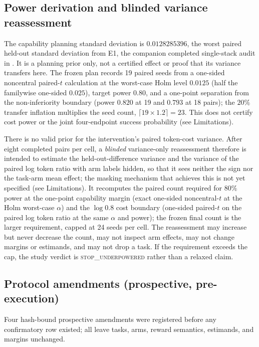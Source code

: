\documentclass[11pt]{article}
\begin{document}
\subsection{Power derivation and blinded variance reassessment}

The capability planning standard deviation is $0.0128285396$, the worst
paired held-out standard deviation from E1, the companion completed
single-stack audit in . It is a planning prior only,
not a certified effect or proof that its variance transfers here. The frozen
plan records 19 paired seeds from a one-sided noncentral paired-$t$
calculation at the worst-case Holm level $0.0125$ (half the familywise
one-sided $0.025$), target power $0.80$, and a one-point separation from the
non-inferiority boundary (power $0.820$ at 19 and $0.793$ at 18 pairs); the
$20\%$ transfer inflation multiplies the seed count,
$\lceil19\times1.2\rceil=23$. This does not certify cost power or the joint
four-endpoint success probability (see Limitations).

There is no valid prior for the intervention's paired token-cost variance. After eight completed pairs per cell, a \emph{blinded} variance-only reassessment therefore is intended to estimate the held-out-difference variance and the variance of the paired log token ratio with arm labels hidden, so that it sees neither the sign nor the task-arm mean effect; the masking mechanism that achieves this is not yet specified (see Limitations). It recomputes the paired count required for $80\%$ power at the one-point capability margin (exact one-sided noncentral-$t$ at the Holm worst-case $\alpha$) and the $\log 0.8$ cost boundary (one-sided paired-$t$ on the paired log token ratio at the same $\alpha$ and power); the frozen final count is the larger requirement, capped at 24 seeds per cell. The reassessment may increase but never decrease the count, may not inspect arm effects, may not change margins or estimands, and may not drop a task. If the requirement exceeds the cap, the study verdict is \textsc{stop\_underpowered} rather than a relaxed claim.

\subsection{Protocol amendments (prospective, pre-execution)}
\label{sec:amendments}

Four hash-bound prospective amendments were registered before any confirmatory row existed; all leave tasks, arms, reward semantics, estimands, and margins unchanged.
\end{document}
